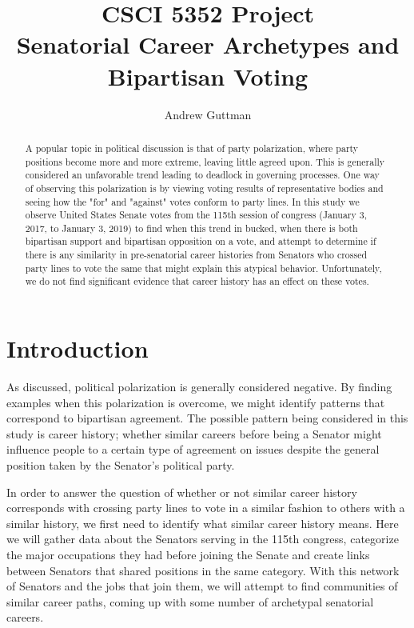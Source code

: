 \documentclass[11pt,twocolumn]{article}
\begin{document}
\title{CSCI 5352 Project\\
Senatorial Career Archetypes and Bipartisan Voting}

\author{Andrew Guttman}

\maketitle
\thispagestyle{empty}

\begin{abstract}
A popular topic in political discussion is that of party polarization, where party positions become more and more extreme, leaving little agreed upon. This is generally considered an unfavorable trend leading to deadlock in governing processes. One way of observing this polarization is by viewing voting results of representative bodies and seeing how the "for" and "against" votes conform to party lines. In this study we observe United States Senate votes from the 115th session of congress (January 3, 2017, to January 3, 2019) to find when this trend in bucked, when there is both bipartisan support and bipartisan opposition on a vote, and attempt to determine if there is any similarity in pre-senatorial career histories from Senators who crossed party lines to vote the same that might explain this atypical behavior. Unfortunately, we do not find significant evidence that career history has an effect on these votes.
\end{abstract}

\section{Introduction}
As discussed, political polarization is generally considered negative. By finding examples when this polarization is overcome, we might identify patterns that correspond to bipartisan agreement. The possible pattern being considered in this study is career history; whether similar careers before being a Senator might influence people to a certain type of agreement on issues despite the general position taken by the Senator's political party.
	
In order to answer the question of whether or not similar career history corresponds with crossing party lines to vote in a similar fashion to others with a similar history, we first need to identify what similar career history means. Here we will gather data about the Senators serving in the 115th congress, categorize the major occupations they had before joining the Senate and create links between Senators that shared positions in the same category. With this network of Senators and the jobs that join them, we will attempt to find communities of similar career paths, coming up with some number of archetypal senatorial careers.
	
\end{document}
